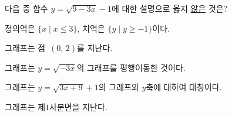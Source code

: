 \hspace*{2mm}\begin{minipage}[t]{\dimexpr\linewidth-2mm\relax}\vspace{0pt}
다음 중 함수 $y=\sqrt{9-3x}-1$에 대한 설명으로 옳지 \underline{않은} 것은?
\begin{choicesv}{\rule[-3ex]{0pt}{8ex}정의역은 $\{x \mid x\le 3\}$, 치역은 $\{y \mid y\ge -1\}$이다.}{\rule[-3ex]{0pt}{8ex}그래프는 점~$(0,\,2)$를 지난다.}{\rule[-3ex]{0pt}{8ex}그래프는 $y=\sqrt{-3x}$의 그래프를 평행이동한 것이다.}{\rule[-3ex]{0pt}{8ex}그래프는 $y=\sqrt{3x+9}+1$의 그래프와 $y$축에 대하여 대칭이다.}{\rule[-3ex]{0pt}{8ex}그래프는 제$1$사분면을 지난다.}\end{choicesv}\end{minipage}
